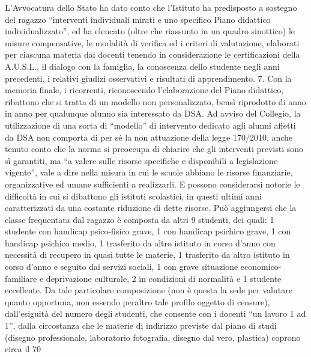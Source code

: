 L’Avvocatura dello Stato ha dato conto che l’Istituto ha predisposto a sostegno del ragazzo “interventi individuali mirati e uno specifico Piano didattico individualizzato”, ed ha elencato (oltre che riassunto in un quadro sinottico) le misure compensative, le modalità di verifica ed i criteri di valutazione, elaborati per ciascuna materia dai docenti tenendo in considerazione le certificazioni della A.U.S.L., il dialogo con la famiglia, la conoscenza dello studente negli anni precedenti, i relativi giudizi osservativi e risultati di apprendimento.
7. Con la memoria finale, i ricorrenti, riconoscendo l’elaborazione del Piano didattico, ribattono che si tratta di un modello non personalizzato, bensì riprodotto di anno in anno per qualunque alunno sia interessato da DSA.
Ad avviso del Collegio, la utilizzazione di una sorta di “modello” di intervento dedicato agli alunni affetti da DSA non comporta di per sé la non attuazione della legge 170/2010, anche tenuto conto che la norma si preoccupa di chiarire che gli interventi previsti sono sì garantiti, ma “a valere sulle risorse specifiche e disponibili a legislazione vigente”, vale a dire nella misura in cui le scuole abbiano le risorse finanziarie, organizzative ed umane sufficienti a realizzarli. E possono considerarsi notorie le difficoltà in cui si dibattono gli istituti scolastici, in questi ultimi anni caratterizzati da una costante riduzione di dette risorse.
Può aggiungersi che la classe frequentata dal ragazzo è composta da altri 9 studenti, dei quali: 1 studente con handicap psico-fisico grave, 1 con handicap psichico grave, 1 con handicap psichico medio, 1 trasferito da altro istituto in corso d’anno con necessità di recupero in quasi tutte le materie, 1 trasferito da altro istituto in corso d’anno e seguito dai servizi sociali, 1 con grave situazione economico-familiare e deprivazione culturale, 2 in condizioni di normalità e 1 studente eccellente. Da tale particolare composizione (non è questa la sede per valutare quanto opportuna, non essendo peraltro tale profilo oggetto di censure), dall’esiguità del numero degli studenti, che consente con i docenti “un lavoro 1 ad 1”, dalla circostanza che le materie di indirizzo previste dal piano di studi (disegno professionale, laboratorio fotografia, disegno dal vero, plastica) coprono circa il 70 %
